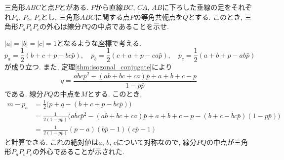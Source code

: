 \begin{bprb}
三角形$ABC$と点$P$とがある.
$P$から直線$BC$, $CA$, $AB$に下ろした垂線の足をそれぞれ$P_a$, $P_b$, $P_c$とし, 三角形$ABC$に関する点$P$の等角共軛点を$Q$とする.
このとき, 三角形$P_aP_bP_c$の外心は線分$PQ$の中点であることを示せ.
\end{bprb}
\begin{ifsol*}
$\lvert a\rvert=\lvert b\rvert=\lvert c\rvert=1$となるような座標で考える.
\[p_a=\frac 12(b+c+p-bc\bar p),\quad p_b=\frac 12(c+a+p-ca\bar p),\quad p_c=\frac 12(a+b+p-ab\bar p)\]
が成り立つ.
また, 定理\ref{thm:isogonal_conjugate}により
\[q=\frac{abc\bar p^2-(ab+bc+ca)\bar p+a+b+c-p}{1-p\bar p}\]
である.
線分$PQ$の中点を$M$とする.
このとき,
\begin{align*}
m-p_a
&=\frac 12\bigl(p+q-(b+c+p-bc\bar p)\bigr)\\
&=\frac 1{2(1-p\bar p)}\bigl(abc\bar p^2-(ab+bc+ca)\bar p+a+b+c-p-(b+c-bc\bar p)(1-p\bar p)\bigr)\\
&=\frac 1{2(1-p\bar p)}(p-a)(b\bar p-1)(c\bar p-1)
\end{align*}
と計算できる.
これの絶対値は$a$, $b$, $c$について対称なので, 線分$PQ$の中点が三角形$P_aP_bP_c$の外心であることが示された.
\end{ifsol*}